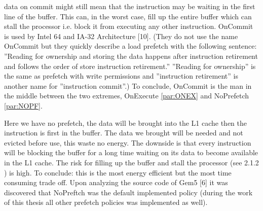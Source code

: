 data on commit might still mean that the instruction may be waiting in the first line
of the buffer. This can, in the worst case, fill up the entire buffer which can stall the
processor i.e. block it from executing any other instruction. OnCommit is used by
Intel 64 and IA-32 Architecture [10]\fixme. (They do not use the name OnCommit but they
quickly describe a load prefetch with the following sentence: ”Reading for ownership
and storing the data happens after instruction retirement and follows the order of
store instruction retirement.” ”Reading for ownership” is the same as prefetch with
write permissions and ”instruction retirement” is another name for ”instruction commit”.)
To conclude, OnCommit is the man in the middle between the two extremes,
OnExecute \ref{par:ONEX} and NoPrefetch \ref{par:NOPF}.

 Here we have no prefetch, the data will be brought into the
L1 cache then the instruction is first in the buffer. The data we brought will be
needed and not evicted before use, this waste no energy. The downside is that every
instruction will be blocking the buffer for a long time waiting on its data to become
available in the L1 cache. The risk for filling up the buffer and stall the processor
(see 2.1.2 \fixme) is high. To conclude: this is the most energy efficient but the most time
consuming trade off. Upon analyzing the source code of Gem5 [6] \fixme it was discovered
that NoPreftch was the default implemented policy (during the work of this thesis all
other prefetch policies was implemented as well).


